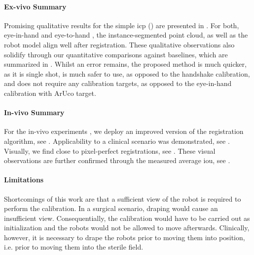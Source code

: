 \paragraph{Ex-vivo Summary} Promising qualitative results for the simple \gls{icp} () are presented in . For both, eye-in-hand  and eye-to-hand , the instance-segmented point cloud, as well as the robot model align well after registration. These qualitative observations also solidify through our quantitative comparisons against baselines, which are summarized in . Whilst an error remains, the proposed method is much quicker, as it is single shot, is much safer to use, as opposed to the handshake calibration, and does not require any calibration targets, as opposed to the eye-in-hand calibration with ArUco target.

\paragraph{In-vivo Summary} For the in-vivo experiments , we deploy an improved version of the registration algorithm, see . Applicability to a clinical scenario was demonstrated, see . Visually, we find close to pixel-perfect registrations, see . These visual observations are further confirmed through the measured average \gls{iou}, see .

\paragraph{Limitations} Shortcomings of this work are that a sufficient view of the robot is required to perform the calibration. In a surgical scenario, draping would cause an insufficient view. Consequentially, the calibration would have to be carried out as initialization and the robots would not be allowed to move afterwards. Clinically, however, it is necessary to drape the robots prior to moving them into position, i.e. prior to moving them into the sterile field.

